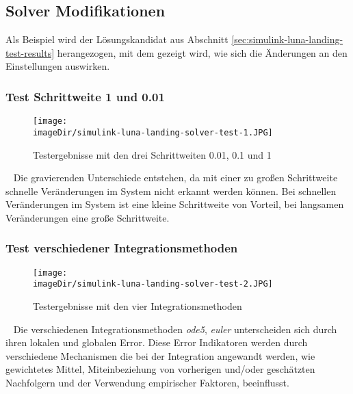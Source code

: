 \subsection{Solver Modifikationen}
\label{sec:sub-simulink-solver-luna-landing}
Als Beispiel wird der Lösungskandidat aus Abschnitt \ref{sec:simulink-luna-landing-test-results} herangezogen, mit dem gezeigt wird, wie sich die Änderungen an den Einstellungen auswirken.

\subsubsection{Test Schrittweite 1 und 0.01}
\begin{figure}[h]
	\centering
	\texttt{[image: \\imageDir/simulink-luna-landing-solver-test-1.JPG]}
	\caption{Testergebnisse mit den drei Schrittweiten 0.01, 0.1 und 1}
	\label{fig:simulink-luna-landing-solver-test-1-1}
\end{figure}
\ \newline
Die gravierenden Unterschiede entstehen, da mit einer zu großen Schrittweite schnelle Veränderungen im System nicht erkannt werden können. Bei schnellen Veränderungen im System ist eine kleine Schrittweite von Vorteil, bei langsamen Veränderungen eine große Schrittweite.

\subsubsection{Test verschiedener Integrationsmethoden}
\begin{figure}[h]
	\centering
	\texttt{[image: \\imageDir/simulink-luna-landing-solver-test-2.JPG]}
	\caption{Testergebnisse mit den vier Integrationsmethoden}
	\label{fig:simulink-luna-landing-solver-test-1-1}
\end{figure}
\ \newline
Die verschiedenen Integrationsmethoden \emph{ode5}, \emph{euler} unterscheiden sich durch ihren lokalen und globalen Error. Diese Error Indikatoren werden  durch verschiedene Mechanismen die bei der Integration angewandt werden, wie gewichtetes Mittel, Miteinbeziehung von vorherigen und/oder geschätzten Nachfolgern und der Verwendung empirischer Faktoren, beeinflusst.
\newpage

\begin{code}
	\caption{Testprogramm für die Simulation mit modifiziertem Solver}
	\label{fig:luna-landing-solver-m}
\end{code}

